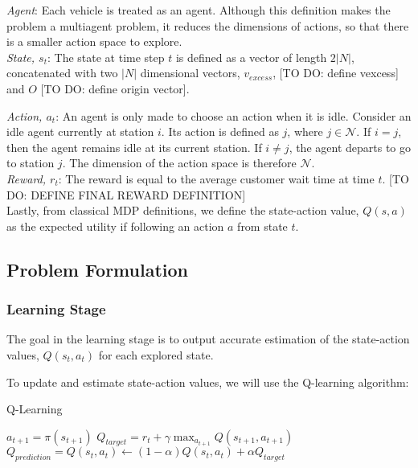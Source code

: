 \documentclass[letterpaper, 10 pt, conference]{ieeeconf}  %
\begin{document}
\noindent \textit{Agent}: Each vehicle is treated as an agent. Although this definition makes the problem a multiagent problem, it reduces the dimensions of actions, so that there is a smaller action space to explore. \\

\noindent \textit{State, $s_t$}: The state at time step $t$ is defined as a vector of length $2|N|$, concatenated with two $|N|$ dimensional vectors, $v_{excess}$, [TO DO: define vexcess] and $O$ [TO DO: define origin vector]. 

\noindent \textit{Action, $a_t$}: An agent is only made to choose an action when it is idle. Consider an idle agent currently at station $i$. Its action is defined as $j$, where $j\in \mathcal{N}$. If $i = j$, then the agent remains idle at its current station. If $i \neq j$, the agent departs to go to station $j$. The dimension of the action space is therefore $\mathcal{N}$. \\

\noindent \textit{Reward, $r_t$}: The reward is equal to the average customer wait time at time $t$. [TO DO: DEFINE FINAL REWARD DEFINITION] \\ 

Lastly, from classical MDP definitions, we define the state-action value, $Q(s,a)$ as the expected utility if following an action $a$ from state $t$.

\subsection{Problem Formulation}
\subsubsection{Learning Stage}
The goal in the learning stage is to output accurate estimation of the state-action values, $Q(s_t,a_t)$ for each explored state.

To update and estimate state-action values, we will use the Q-learning algorithm:
\begin{algorithm}[H]
\caption{Q-Learning}
\begin{algorithmic}
    \State $a_{t+1} = \pi(s_{t+1})$
    \State $Q_{target} = r_t+\gamma \max_{a_{t+1}} Q(s_{t+1},a_{t+1})$
    \State $Q_{prediction} = Q(s_t,a_t) \leftarrow (1-\alpha) Q(s_t,a_t)+\alpha Q_{target}$
\EndFor
\end{algorithmic}
\end{algorithm}
\end{document}

